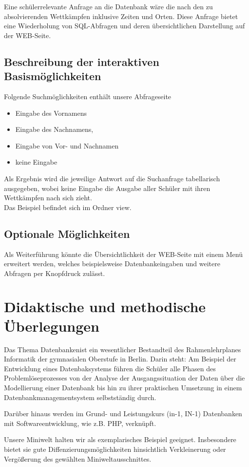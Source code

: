 \documentclass[pagesize,11pt,twoside]{scrartcl}
\begin{document}
Eine schülerrelevante Anfrage an die Datenbank wäre die nach den zu absolvierenden Wettkämpfen inklusive Zeiten und Orten.
Diese Anfrage bietet eine Wiederholung von SQL-Abfragen und deren übersichtlichen Darstellung auf der WEB-Seite.
\subsection{Beschreibung der interaktiven Basismöglichkeiten}
Folgende Suchmöglichkeiten enthält unsere Abfrageseite
\begin{itemize}
 \item Eingabe des Vornamens
\item Eingabe des Nachnamens,
\item Eingabe von Vor- und Nachnamen
\item keine Eingabe
\end{itemize}
Als Ergebnis wird die jeweilige Antwort auf die Suchanfrage tabellarisch ausgegeben, wobei keine Eingabe die Ausgabe aller Schüler
mit ihren Wettkämpfen nach sich zieht.\\

Das Beispiel befindet sich im Ordner \glqq view\grqq .
\subsection{Optionale Möglichkeiten}
Als Weiterführung könnte die Übersichtlichkeit der WEB-Seite mit einem Menü erweitert werden, welches beispielsweise
Datenbankeingaben und weitere Abfragen per Knopfdruck zulässt.
\newpage
\section{Didaktische und methodische Überlegungen}
Das Thema \glqq Datenbanken\grqq ist ein wesentlicher Bestandteil des Rahmenlehrplanes Informatik der gymnasialen Oberstufe in Berlin.
Darin steht: \glqq Am Beispiel der Entwicklung eines Datenbaksystems führen die Schüler alle Phasen des Problemlöseprozesses 
von der Analyse der Ausgangssituation der Daten über die Modellierung einer Datenbank bis hin zu ihrer praktischen Umsetzung in einem
 Datenbankmanagementsystem selbstständig durch.\grqq

Darüber hinaus werden im Grund- und Leistungskurs (in-1, IN-1) Datenbanken mit Softwareentwicklung, wie z.B. PHP, verknüpft. 

Unsere Miniwelt halten wir als exemplarisches Beispiel geeignet. Insbesondere bietet sie gute Diffenzierungsmöglichkeiten hinsichtlich 
Verkleinerung oder Vergößerung des gewählten Miniweltausschnittes.\\
\end{document}
